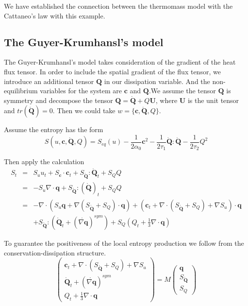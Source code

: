 \documentclass[a4paper]{article}
\begin{document}
We have established the connection between the thermomass model with the Cattaneo's law with this example.
\subsection{The Guyer-Krumhansl's model}
The Guyer-Krumhansl's model takes consideration of the gradient of the heat flux tensor. In order to include the spatial gradient of the flux tensor, we introduce an additional tensor $\mathbf{Q}$ in our dissipation variable. And the non-equilibrium variables for the system are $\mathbf{c}$ and $\mathbf{Q}$.We assume the tensor $\mathbf{Q}$ is symmetry and decompose the tensor $\mathbf{Q}=\mathring{\mathbf{Q}}+Q\mathbf{U}$, where $\mathbf{U}$ is the unit tensor and $tr(\mathring{\mathbf{Q}})=0$. Then we could take $w=\{\mathbf{c},\mathring{\mathbf{Q}},Q\}$.

Assume the entropy has the form
\begin{equation}
S(u,\mathbf{c},\mathring{\mathbf{Q}},Q)=S_{eq}(u)-\frac{1}{2 \alpha_0}\mathbf{c}^2-\frac{1}{2\tau_1} {\mathring{\mathbf{Q}}}:{\mathring{\mathbf{Q}}}-\frac{1}{2\tau_2}Q^2
\end{equation}

Then apply the calculation
\begin{eqnarray}
S_t &=& S_u u_t +S_{\mathbf{c}} \cdot \mathbf{c}_t + S_{\mathring{\mathbf{Q}}}:\mathring{\mathbf{Q}}_t+S_Q Q \\
    &=& -S_u \nabla \cdot \mathbf{q} + S_{\mathring{\mathbf{Q}}}:(\mathring{\mathbf{Q}})_t+S_QQ \\
    &=& -\nabla \cdot (S_u \mathbf{q}+\nabla (S_{\mathring{\mathbf{Q}}}+S_Q) \cdot \mathbf{q})+(\mathbf{c}_t+\nabla \cdot (S_{\mathring{\mathbf{Q}}}+S_Q)+\nabla S_u) \cdot \mathbf{q} \\
&& +S_{\mathring{\mathbf{Q}}}:(\mathring{\mathbf{Q}}_t+(\mathring{\nabla \mathbf{q}})^{sym})+S_Q(Q_t+\frac{1}{3}\nabla \cdot \mathbf{q})
\end{eqnarray}

To guarantee the positiveness of the local entropy production we follow from the conservation-dissipation structure.
\begin{equation}
\left( \begin{array}{ll} \mathbf{c}_t+\nabla \cdot (S_{\mathring{\mathbf{Q}}}+S_Q)+\nabla S_u \\ \mathring{\mathbf{Q}}_t+(\mathring{\nabla \mathbf{q}})^{sym} \\ Q_t+\frac{1}{3} \nabla \cdot \mathbf{q} \end{array} \right) = M \left( \begin{array}{l} \mathbf{q} \\ S_{\mathring{\mathbf{Q}}} \\S_Q \end{array} \right) 
\end{equation}
\end{document}

